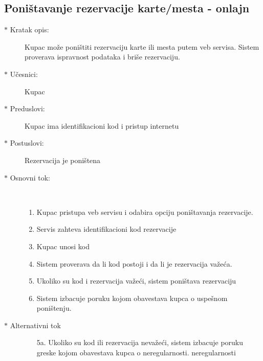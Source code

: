 \subsection{Poni\v stavanje rezervacije karte/mesta - onlajn}
\begin{description}
  \item[$\ast$ Kratak opis: ] Kupac mo\v ze poni\v stiti rezervaciju karte ili mesta putem veb servisa. 
			 	Sistem proverava ispravnost podataka i bri\v se rezervaciju.
  \item[$\ast$ U\v cesnici: ] Kupac
  \item[$\ast$ Preduslovi: ] Kupac ima identifikacioni kod i pristup internetu
  \item[$\ast$ Postuslovi: ] Rezervacija je poni\v stena
  \item[$\ast$ Osnovni tok: ] \ \\
  \begin{enumerate}
    \item Kupac pristupa veb servisu i odabira opciju poni\v stavanja rezervacije.
    \item Servis zahteva identifikacioni kod rezervacije
    \item Kupac unosi kod
    \item Sistem proverava da li kod postoji i da li je rezervacija va\v ze\'ca.
    \item Ukoliko su kod i rezervacija va\v ze\'ci, sistem poni\v stava rezervaciju
    \item Sistem izbacuje poruku kojom obavestava kupca o uspe\v snom poni\v stenju.
  \end{enumerate}
  \item[$\ast$ Alternativni tok]
  \begin{enumerate}
    \item[5a. ]  Ukoliko su kod ili rezervacija neva\v ze\'ci, sistem izbacuje poruku greske kojom obavestava kupca o neregularnosti. 
		neregularnosti
  \end{enumerate}
  
\end{description}

